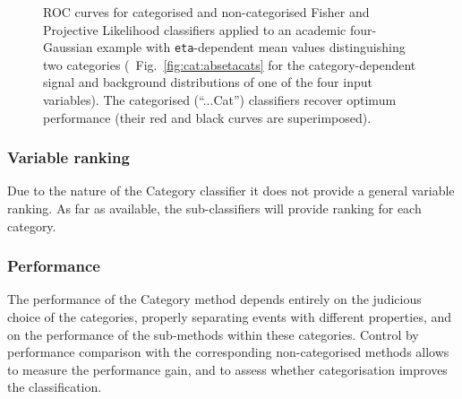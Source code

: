 \begin{figure}[p]
\begin{center}
\end{center}
\vspace{-0.5cm}
\caption[.]{ROC curves for categorised and non-categorised Fisher and Projective Likelihood
            classifiers applied to an academic four-Gaussian example with {\tt eta}-dependent
            mean values distinguishing two categories (\cf\  Fig.~\ref{fig:cat:absetacats} for the
            category-dependent signal and background distributions of one of the four input 
            variables). The categorised (``...Cat'') classifiers recover optimum performance
            (their red and black curves are superimposed). }
\label{fig:cat:roc}
\end{figure}

\subsubsection{Variable ranking}

Due to the nature of the Category classifier it does not provide a
general variable ranking. As far as available, the sub-classifiers 
will provide ranking for each category.

\subsubsection{Performance}

The performance of the Category method depends entirely on the judicious choice
of the categories, properly separating events with different properties, and on 
the performance of the sub-methods within these categories. Control by performance
comparison with the corresponding non-categorised methods allows to measure the 
performance gain, and to assess whether categorisation improves the classification. 

